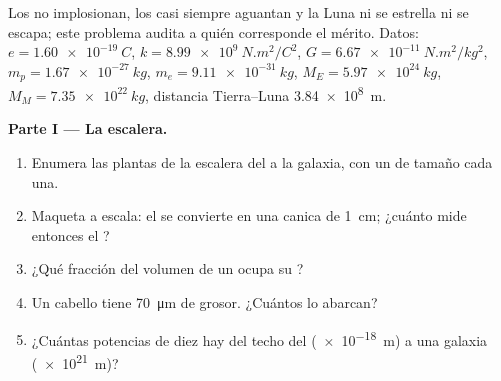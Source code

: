 \begin{problem}
\label{pb:g11:fundamental-interactions:1}
Los  no implosionan, los  casi siempre aguantan y la Luna
ni se estrella ni se escapa; este problema audita a quién corresponde el
mérito. Datos: $e = \qty{1.60e-19}{C}$,
$k = \qty{8.99e9}{N.m^2/C^2}$, $G = \qty{6.67e-11}{N.m^2/kg^2}$,
$m_p = \qty{1.67e-27}{kg}$, $m_e = \qty{9.11e-31}{kg}$,
$M_E = \qty{5.97e24}{kg}$, $M_M = \qty{7.35e22}{kg}$, distancia
Tierra--Luna \qty{3.84e8}{m}.

\medskip
\noindent\textbf{Parte I --- La escalera.}
\begin{enumerate}
  \item Enumera las plantas de la escalera del  a la galaxia, con
        un  de tamaño cada una.
  \item Maqueta a escala: el  se convierte en una canica de
        \qty{1}{cm}; ¿cuánto mide entonces el ?
  \item ¿Qué fracción del volumen de un  ocupa su ?
  \item Un cabello tiene \qty{70}{\micro m} de grosor. ¿Cuántos 
        lo abarcan?
  \item ¿Cuántas potencias de diez hay del techo del 
        (\qty{e-18}{m}) a una galaxia (\qty{e21}{m})?
\end{enumerate}


\end{problem}
